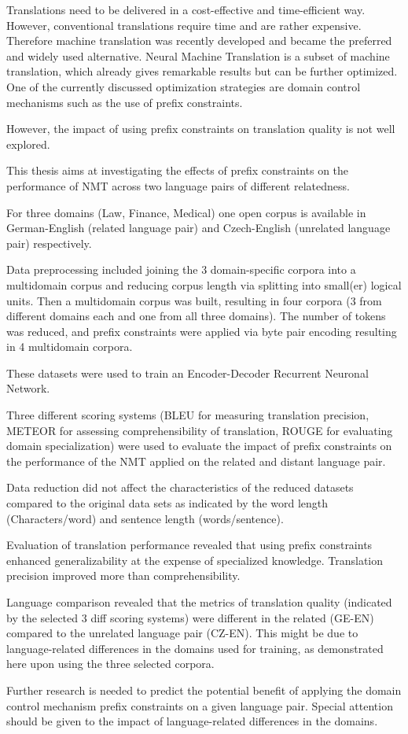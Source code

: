 Translations need to be delivered in a cost-effective and time-efficient way.
However, conventional translations require time and are rather expensive.
Therefore machine translation was recently developed and became the preferred and widely used alternative. 
Neural Machine Translation is a subset of machine translation, which already gives remarkable results but can be further optimized. One of the currently discussed optimization strategies are domain control mechanisms such as the use of prefix constraints. 

However, the impact of using prefix constraints on translation quality is not well explored. 

This thesis aims at investigating the effects of prefix constraints on the performance of NMT across two language pairs of different relatedness. 

For three domains (Law, Finance, Medical) one open corpus is available in German-English (related language pair) and Czech-English (unrelated language pair) respectively. 

Data preprocessing included joining the 3 domain-specific corpora into a multidomain corpus and reducing corpus length via splitting into small(er) logical units. Then a multidomain corpus was built, resulting in four corpora (3 from different domains each and one from all three domains). The number of tokens was reduced, and prefix constraints were applied via byte pair encoding resulting in 4 multidomain corpora. 

These datasets were used to train an Encoder-Decoder Recurrent Neuronal Network.

Three different scoring systems  (BLEU for measuring translation precision, METEOR for assessing comprehensibility of translation, ROUGE for evaluating domain specialization) were used to evaluate the impact of prefix constraints on the performance of the NMT applied on the related and distant language pair. 

Data reduction did not affect the characteristics of the reduced datasets compared to the original data sets as indicated by the word length (Characters/word) and sentence length (words/sentence).

Evaluation of translation performance revealed that using prefix constraints enhanced generalizability at the expense of specialized knowledge. Translation precision improved more than comprehensibility.

Language comparison revealed that the metrics of translation quality (indicated by the selected 3 diff scoring systems) were different in the related (GE-EN) compared to the unrelated language pair (CZ-EN).
This might be due to language-related differences in the domains used for training, as demonstrated here upon using the three selected corpora. 

Further research is needed to predict the potential benefit of applying the domain control mechanism prefix constraints on a given language pair.
Special attention should be given to the impact of language-related differences in the domains.
